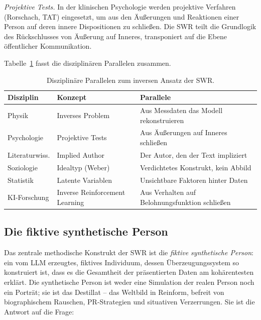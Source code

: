 \documentclass[11pt,a4paper]{article}
\theoremstyle{definition}
\theoremstyle{plain}
\theoremstyle{remark}
\begin{document}
\emph{Projektive Tests.} In der klinischen Psychologie werden projektive Verfahren (Rorschach, TAT) eingesetzt, um aus den \"Au\ss{}erungen und Reaktionen einer Person auf deren innere Dispositionen zu schlie\ss{}en. Die SWR teilt die Grundlogik des R\"uckschlusses von \"Au\ss{}erung auf Inneres, transponiert auf die Ebene \"offentlicher Kommunikation.

Tabelle~\ref{tab:analogien} fasst die disziplin\"aren Parallelen zusammen.

\begin{table}[htbp]
  \centering
  \caption{Disziplin\"are Parallelen zum inversen Ansatz der SWR.}
  \label{tab:analogien}
  \begin{tabularx}{\textwidth}{l l X}
    \toprule
    \textbf{Disziplin} & \textbf{Konzept} & \textbf{Parallele} \\
    \midrule
    Physik & Inverses Problem & Aus Messdaten das Modell rekonstruieren \\
    Psychologie & Projektive Tests & Aus \"Au\ss{}erungen auf Inneres schlie\ss{}en \\
    Literaturwiss. & Implied Author & Der Autor, den der Text impliziert \\
    Soziologie & Idealtyp (Weber) & Verdichtetes Konstrukt, kein Abbild \\
    Statistik & Latente Variablen & Unsichtbare Faktoren hinter Daten \\
    KI-Forschung & Inverse Reinforcement Learning & Aus Verhalten auf Belohnungsfunktion schlie\ss{}en \\
    \bottomrule
  \end{tabularx}
\end{table}


\subsection{Die fiktive synthetische Person}
\label{sec:person}

Das zentrale methodische Konstrukt der SWR ist die \emph{fiktive synthetische Person}: ein vom LLM erzeugtes, fiktives Individuum, dessen \"Uberzeugungssystem so konstruiert ist, dass es die Gesamtheit der pr\"asentierten Daten am koh\"arentesten erkl\"art. Die synthetische Person ist weder eine Simulation der realen Person noch ein Portr\"at; sie ist das Destillat -- das Weltbild in Reinform, befreit von biographischem Rauschen, PR-Strategien und situativen Verzerrungen. Sie ist die Antwort auf die Frage:
\end{document}
